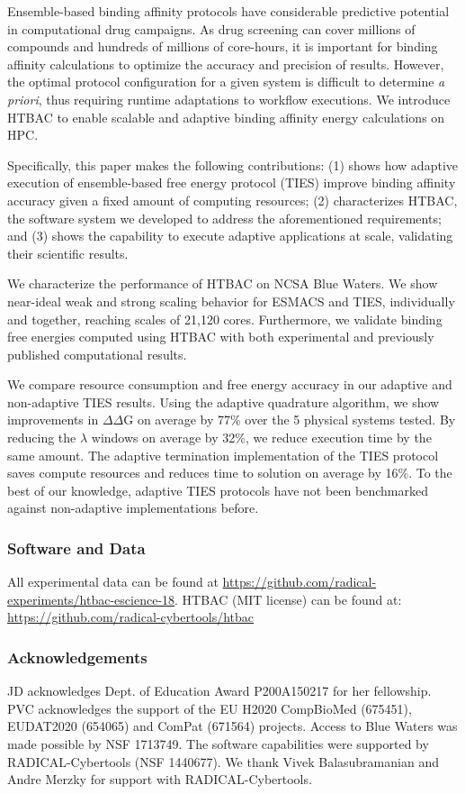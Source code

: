 Ensemble-based binding affinity protocols have  considerable predictive
potential in computational drug campaigns. As drug screening can cover
millions of compounds and hundreds of millions of core-hours, it is important
for binding affinity calculations to optimize the accuracy and precision of
results. However, the optimal protocol configuration for a given system is
difficult to determine {\it a priori}, thus requiring runtime adaptations to
workflow executions. We introduce HTBAC to enable scalable and adaptive
binding affinity energy calculations on HPC.

Specifically, this paper makes the following contributions: (1) shows how
adaptive execution of ensemble-based free energy protocol (TIES) improve
binding affinity accuracy given a fixed amount of computing resources; (2)
characterizes HTBAC, the software system we developed to address the
aforementioned requirements; and (3) shows the capability to execute adaptive
applications at scale, validating their scientific results.

We characterize the performance of HTBAC on NCSA Blue Waters. We show
near-ideal weak and strong scaling behavior for ESMACS and TIES, individually
and together, reaching scales of 21,120 cores. Furthermore, we validate
binding free energies computed using HTBAC with both experimental and
previously published computational results.

We compare resource consumption and free energy accuracy in our adaptive and
non-adaptive TIES results. Using the adaptive quadrature algorithm, we show
improvements in $\Delta \Delta$G on average by 77\% over the 5 physical
systems tested. By reducing the $\lambda$ windows on average by 32\%, we
reduce execution time by the same amount. The adaptive termination
implementation of the TIES protocol saves compute resources and reduces time
to solution on average by 16\%. To the best of our knowledge, adaptive TIES
protocols have not been benchmarked against non-adaptive implementations
before.

\subsubsection*{Software and Data}

{\footnotesize All experimental data can be found at
\url{https://github.com/radical-experiments/htbac-escience-18}. HTBAC (MIT
license) can be found at: \url{https://github.com/radical-cybertools/htbac}}

\subsubsection*{Acknowledgements}

{\footnotesize JD acknowledges Dept. of Education Award P200A150217 for her
fellowship. PVC acknowledges the support of the EU H2020 CompBioMed (675451),
EUDAT2020 (654065) and ComPat (671564) projects. Access to Blue Waters was
made possible by NSF 1713749. The software capabilities were supported by
RADICAL-Cybertools (NSF 1440677). We thank Vivek Balasubramanian and Andre
Merzky for support with RADICAL-Cybertools.}
